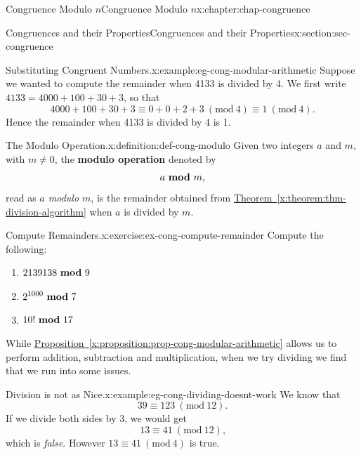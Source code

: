\documentclass[oneside,10pt,]{book}
\newcommand{\xreffont}{\relax}
\newcommand{\terminology}[1]{\textbf{#1}}
\numberwithin{equation}{section}
\newcommand{\Mod}[1]{\ \left(\mathrm{mod}\ #1\right)}
\newcommand{\mmod}[1]{\ \mathrm{\bf mod}\ #1}
\begin{document}
\begin{chapterptx}{Congruence Modulo \(n\)}{}{Congruence Modulo \(n\)}{}{}{x:chapter:chap-congruence}
\begin{sectionptx}{Congruences and their Properties}{}{Congruences and their Properties}{}{}{x:section:sec-congruence}
\begin{example}{Substituting Congruent Numbers.}{x:example:eg-cong-modular-arithmetic}%
Suppose we wanted to compute the remainder when 4133 is divided by 4. We first write \(4133 = 4000 + 100 + 30 + 3\), so that%
\begin{equation*}
4000 + 100 + 30 + 3 \equiv 0 + 0 + 2 + 3 \Mod{4} \equiv 1 \Mod{4}\text{.}
\end{equation*}
Hence the remainder when 4133 is divided by 4 is 1.%
\end{example}
\begin{definition}{The Modulo Operation.}{x:definition:def-cong-modulo}%
Given two integers \(a\) and \(m\), with \(m \ne 0\), the \terminology{modulo operation} denoted by%
\begin{equation*}
a \mmod{m}\text{,}
\end{equation*}
read as \emph{\(a\) modulo \(m\)}, is the remainder obtained from \hyperref[x:theorem:thm-division-algorithm]{Theorem~{\xreffont\ref{x:theorem:thm-division-algorithm}}} when \(a\) is divided by \(m\). \label{g:notation:id535625}%
\end{definition}
\begin{inlineexercise}{Compute Remainders.}{x:exercise:ex-cong-compute-remainder}%
Compute the following:%
\begin{enumerate}[label=(\alph*)]
\item{}\(\displaystyle 2139138 \mmod 9\)%
\item{}\(\displaystyle 2^{1000} \mmod 7\)%
\item{}\(\displaystyle 10! \mmod 17\)%
\end{enumerate}
%
\end{inlineexercise}%
While \hyperref[x:proposition:prop-cong-modular-arithmetic]{Proposition~{\xreffont\ref{x:proposition:prop-cong-modular-arithmetic}}} allows us to perform addition, subtraction and multiplication, when we try dividing we find that we run into some issues.%
\begin{example}{Division is not as Nice.}{x:example:eg-cong-dividing-doesnt-work}%
We know that%
\begin{equation*}
39 \equiv 123 \Mod{12}\text{.}
\end{equation*}
If we divide both sides by 3, we would get%
\begin{equation*}
13 \equiv 41 \Mod{12}\text{,}
\end{equation*}
which is \emph{false}. However \(13 \equiv 41 \Mod{4}\) is true.%
\end{example}

\end{sectionptx}
\end{chapterptx}
\end{document}
